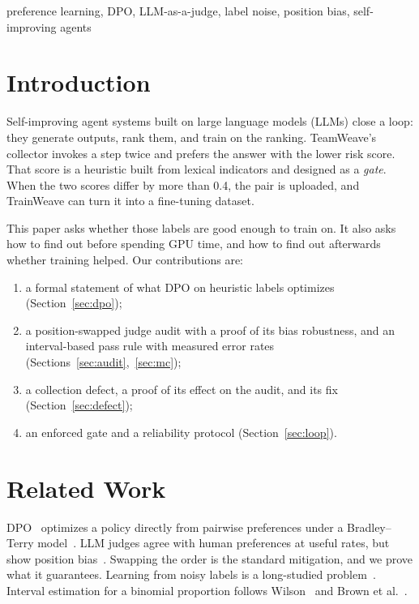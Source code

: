 \documentclass[conference]{IEEEtran}
\theoremstyle{remark}
\begin{document}
\begin{IEEEkeywords}
preference learning, DPO, LLM-as-a-judge, label noise, position bias, self-improving agents
\end{IEEEkeywords}

\section{Introduction}
Self-improving agent systems built on large language models (LLMs) close a loop: they generate outputs, rank them, and train on the ranking. TeamWeave's collector invokes a step twice and prefers the answer with the lower risk score. That score is a heuristic built from lexical indicators and designed as a \emph{gate}. When the two scores differ by more than 0.4, the pair is uploaded, and TrainWeave can turn it into a fine-tuning dataset.

This paper asks whether those labels are good enough to train on. It also asks how to find out before spending GPU time, and how to find out afterwards whether training helped. Our contributions are:
\begin{enumerate}
\item a formal statement of what DPO on heuristic labels optimizes (Section~\ref{sec:dpo});
\item a position-swapped judge audit with a proof of its bias robustness, and an interval-based pass rule with measured error rates (Sections~\ref{sec:audit},~\ref{sec:mc});
\item a collection defect, a proof of its effect on the audit, and its fix (Section~\ref{sec:defect});
\item an enforced gate and a reliability protocol (Section~\ref{sec:loop}).
\end{enumerate}

\section{Related Work}
DPO~\cite{rafailov2023} optimizes a policy directly from pairwise preferences under a Bradley--Terry model~\cite{bradley1952}. LLM judges agree with human preferences at useful rates, but show position bias~\cite{zheng2023judge,wang2023fair}. Swapping the order is the standard mitigation, and we prove what it guarantees. Learning from noisy labels is a long-studied problem~\cite{frenay2014}. Interval estimation for a binomial proportion follows Wilson~\cite{wilson1927} and Brown et al.~\cite{brown2001}.
\end{document}
